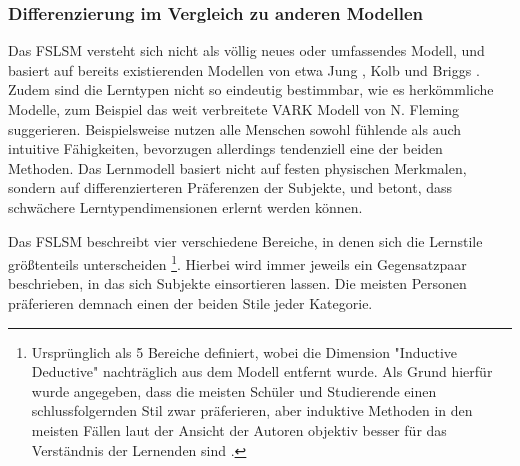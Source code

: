 \subsubsection{Differenzierung im Vergleich zu anderen Modellen}
Das FSLSM versteht sich nicht als völlig neues oder umfassendes Modell, und basiert auf bereits existierenden Modellen von etwa Jung \cite{jung}, Kolb \cite{kolb} und Briggs \cite{myers}.
Zudem sind die Lerntypen nicht so eindeutig bestimmbar, wie es herkömmliche Modelle, zum Beispiel das weit verbreitete VARK Modell von N. Fleming suggerieren.
Beispielsweise nutzen alle Menschen sowohl fühlende als auch intuitive Fähigkeiten, bevorzugen allerdings tendenziell eine der beiden Methoden. Das Lernmodell basiert nicht auf festen physischen Merkmalen, sondern auf differenzierteren Präferenzen der Subjekte, und betont, dass schwächere Lerntypendimensionen erlernt werden können.

Das FSLSM beschreibt vier verschiedene Bereiche, in denen sich die Lernstile größtenteils unterscheiden \footnote{Ursprünglich als 5 Bereiche definiert, wobei die Dimension "Inductive Deductive" nachträglich aus dem Modell entfernt wurde. Als Grund hierfür wurde angegeben, dass die meisten Schüler und Studierende einen schlussfolgernden Stil zwar präferieren, aber induktive Methoden in den meisten Fällen laut der Ansicht der Autoren objektiv besser für das Verständnis der Lernenden sind \cite{felder}.}. Hierbei wird immer jeweils ein Gegensatzpaar beschrieben, in das sich Subjekte einsortieren lassen. Die meisten Personen präferieren demnach einen der beiden Stile jeder Kategorie.

